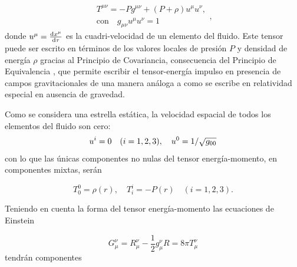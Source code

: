 \begin{equation}
    \begin{array} { c } { T ^ { \mu \nu } = - P g ^ { \mu \nu } + ( P + \rho ) u ^ { \mu } u ^ { \nu } }, \\ \text{con} \quad { g _ { \mu \nu } u ^ { \mu } u ^ { \nu } = 1 } \end{array},
\end{equation}
donde $u^{\mu}=\dv{x^{\mu}}{\tau}$ es la cuadri-velocidad de un elemento del fluido. Este tensor puede ser escrito en términos de los valores locales de presión $P$ y densidad de energía $\rho$ gracias al Principio de Covariancia, consecuencia del Principio de Equivalencia \cite{Weinberg1972GravitationCosmology}, que permite escribir el tensor-energía impulso en presencia de campos gravitacionales de una manera análoga a como se escribe en relatividad especial en ausencia de gravedad.

Como se considera una estrella estática, la velocidad espacial de todos los elementos del fluido son cero:
\begin{equation}
    u^{i}=0 \quad (i=1,2,3)\qc u ^ { 0 } = 1 / \sqrt { g _ { 00 } }
\end{equation}
con lo que las únicas componentes no nulas del tensor energía-momento, en componentes mixtas, serán

\begin{equation}
T _ { 0 } ^ { 0 } = \rho(r) , \quad T _ { i } ^ { i } = - P(r) \quad ( i=1,2,3 ).  
\end{equation}

Teniendo en cuenta la forma del tensor energía-momento las ecuaciones de Einstein

\begin{equation}
    G _ { \mu } ^ { \nu } = R _ { \mu } ^ { \nu } - \frac { 1 } { 2 } g _ { \mu } ^ { \nu } R = 8 \pi T _ { \mu } ^ { \nu }
\end{equation}
tendrán componentes     

